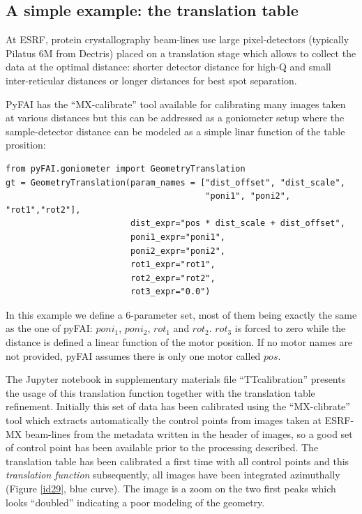 \documentclass[preprint, pdf]{iucr}              %
\begin{document}
\subsection{A simple example: the translation table}

At ESRF, protein crystallography beam-lines use large pixel-detectors (typically
Pilatus 6M from Dectris) placed on a translation stage which allows to collect
the data at the optimal distance: shorter detector distance for high-Q and small
inter-reticular distances or longer distances for best spot separation.

PyFAI has the ``MX-calibrate'' tool available for calibrating many images taken
at various distances but this can be addressed as a goniometer setup where the
sample-detector distance can be modeled as a simple linar function of the table
prosition:

\begin{verbatim}
from pyFAI.goniometer import GeometryTranslation
gt = GeometryTranslation(param_names = ["dist_offset", "dist_scale", 
                                        "poni1", "poni2", "rot1","rot2"],
                         dist_expr="pos * dist_scale + dist_offset", 
                         poni1_expr="poni1",
                         poni2_expr="poni2", 
                         rot1_expr="rot1", 
                         rot2_expr="rot2", 
                         rot3_expr="0.0")
\end{verbatim}
 
In this example we define a 6-parameter set, most of them being exactly the same
as the one of pyFAI: $poni_1$, $poni_2$, $rot_1$ and $rot_2$. $rot_3$ is forced
to zero while the distance is defined a linear function of the motor position.
If no motor names are not provided, pyFAI assumes there is only one motor
called $pos$.

The Jupyter notebook \cite{ipython} in supplementary materials file
``TTcalibration'' presents the usage of this translation function
together with the translation table refinement. 
Initially this set of data has been calibrated using the ``MX-clibrate'' tool
which extracts automatically the control points from images taken at ESRF-MX
beam-lines from the metadata written in the header of images, so a good set
of control point has been available prior to the processing described. 
The translation table has been calibrated a first time with all control points
and this \textit{translation function} subsequently, all images have been
integrated azimuthally (Figure \ref{id29}, blue curve). 
The image is a zoom on the two first peaks which looks ``doubled'' indicating a
poor modeling of the geometry.
\end{document}
